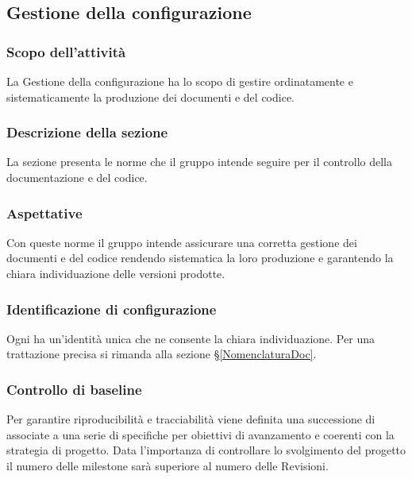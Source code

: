 \subsection{Gestione della configurazione}
\subsubsection{Scopo dell'attività} 
La Gestione della configurazione ha lo scopo di gestire ordinatamente e sistematicamente la produzione dei documenti e del codice.

\subsubsection{Descrizione della sezione} 
La sezione presenta le norme che il gruppo intende seguire per il controllo della documentazione e del codice.

\subsubsection{Aspettative}
Con queste norme il gruppo intende assicurare una corretta gestione dei documenti e del codice rendendo sistematica la loro produzione e garantendo la chiara individuazione delle versioni prodotte.

\subsubsection{Identificazione di configurazione}
Ogni  ha un'identità unica che ne consente la chiara individuazione. Per una trattazione precisa si rimanda alla sezione \S\ref{NomenclaturaDoc}.

\subsubsection{Controllo di baseline}
Per garantire riproducibilità e tracciabilità viene definita una successione di  associate a una serie di  specifiche per obiettivi di avanzamento e coerenti con la strategia di progetto. Data l'importanza di controllare lo svolgimento del progetto il numero delle milestone sarà superiore al numero delle Revisioni.

